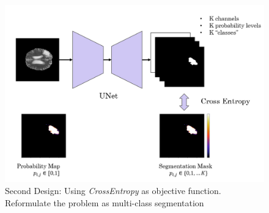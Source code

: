 \documentclass[12pt]{extarticle}
\begin{document}
\begin{figure}[ht!]
\centering
\includegraphics[scale=0.3]{fig6.png}
\caption{Second Design: Using \textit{CrossEntropy} as objective function. Reformulate the problem as multi-class segmentation}
\label{leveling}
\end{figure}
\end{document}
